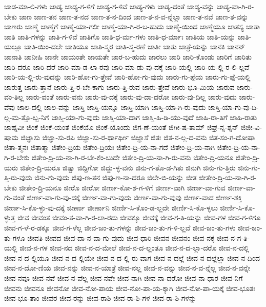 {ಜಾಡ-ಮಾ-ಲಿ-ಗಳು
ಜಾಡ್ಯ
ಜಾಡ್ಯ-ಗ-ಳಿಗೆ
ಜಾಡ್ಯ-ಗ-ಳಿವೆ
ಜಾಡ್ಯ-ಗಳು
ಜಾಡ್ಯ-ದಂತೆ
ಜಾಡ್ಯ-ವನ್ನು
ಜಾಡ್ಯ-ವಾ-ಗಿ-ರ-ಬೇಕು
ಜಾಣ
ಜಾಣ-ತನ
ಜಾಣ-ತ-ನದ
ಜಾಣ-ತ-ನ-ದಿಂದ
ಜಾಣ-ತ-ನ-ವ-ನ್ನೆಲ್ಲಾ
ಜಾಣ-ತ-ನವೆ
ಜಾಣ-ತ-ವನ್ನು
ಜಾಣರು
ಜಾಣ್ಮೆ
ಜಾಣ್ಮೆಗೆ
ಜಾಣ್ಮೆ-ಯಾ-ಗಲೀ
ಜಾಣ್ಮೆ-ಯಾ-ಗಿ-ರ-ಬ-ಹುದು
ಜಾಣ್ಮೆ-ಯಿಂದ
ಜಾಣ್ಮೆಯೂ
ಜಾತಸ್ಯ
ಜಾತಾ
ಜಾತಿ
ಜಾತಿ-ಗಳನ್ನು
ಜಾತಿ-ಗ-ಳಿವೆ
ಜಾತಿಗೊ
ಜಾತಿ-ಧ-ರ್ಮ-ಗಳು
ಜಾತಿ-ಧ-ರ್ಮಾಃ
ಜಾತಿಯ
ಜಾತಿ-ಯನ್ನು
ಜಾತಿ-ಯಲ್ಲೂ
ಜಾತಿ-ಯಿಂ-ದಲೇ
ಜಾತಿಯೂ
ಜಾತಿ-ಸ್ಮರ
ಜಾತಿ-ಸ್ಮ-ರಣೆ
ಜಾತೀ
ಜಾತು
ಜಾತ್ರೆ-ಯನ್ನು
ಜಾನಕಿ
ಜಾನನ್
ಜಾನಾತಿ
ಜಾನೀಹಿ
ಜಾನೇ
ಜಾಯಂತೇ
ಜಾಯತೇ
ಜಾರ-ಬ-ಹುದು
ಜಾರಲು
ಜಾರಿ
ಜಾರಿ-ಕೊಂಡು
ಜಾರಿಗೆ
ಜಾರಿತು
ಜಾರಿ-ದರೂ
ಜಾರಿ-ದರೆ
ಜಾರಿ-ಮಾ-ಡ-ಲಾ-ರವು
ಜಾರಿ-ಮಾ-ಡು-ವು-ದಕ್ಕೆ
ಜಾರಿ-ಯಲ್ಲಿ
ಜಾರಿ-ಯ-ಲ್ಲಿ-ರ-ಲಿ-ಲ್ಲವೆ
ಜಾರಿ-ಯ-ಲ್ಲಿ-ರು-ವುದನ್ನು
ಜಾರಿ-ಹೋ-ಗು-ತ್ತೇವೆ
ಜಾರಿ-ಹೋ-ಗು-ವುದು
ಜಾರು-ಗು-ಪ್ಪೆಯ
ಜಾರು-ಗು-ಪ್ಪೆ-ಯಲ್ಲಿ
ಜಾರುತ್ತ
ಜಾರು-ತ್ತಾನೆ
ಜಾರು-ತ್ತಿ-ರ-ಬೇ-ಕಾಗು
ಜಾರು-ತ್ತಿ-ರುವ
ಜಾರು-ತ್ತೇವೆ
ಜಾರು-ಭೂ-ಮಿಯ
ಜಾರುವ
ಜಾರು-ವಂ-ತಿಲ್ಲ
ಜಾರು-ವಂತೆ
ಜಾರು-ವನು
ಜಾರು-ವು-ದಕ್ಕೆ
ಜಾರು-ವು-ದಾ-ದರೋ
ಜಾರು-ವು-ದಿಲ್ಲ
ಜಾರು-ವುದು
ಜಾರು-ವೆವು
ಜಾಲ-ದಲ್ಲಿ
ಜಾಲ-ವನ್ನು
ಜಾಸ್ತಿ
ಜಾಸ್ತಿ-ಯನ್ನೂ
ಜಾಸ್ತಿ-ಯಾಗಿ
ಜಾಸ್ತಿ-ಯಾ-ಗಿ-ರು-ವುದು
ಜಾಸ್ತಿ-ಯಾ-ಗು-ವು-ದಿ-ಲ್ಲ-ಮ-ತ್ತೊ-ಬ್ಬ-ನಿಗೆ
ಜಾಸ್ತಿ-ಯಾ-ಗು-ವುದು
ಜಾಸ್ತಿ-ಯಾ-ದಾಗ
ಜಾಸ್ತಿ-ಹಿ-ಡಿ-ಯು-ವುದೆ
ಜಾಹಿ-ರಾ-ತಿಗೆ
ಜಾಹಿ-ರಾತು
ಜಾಹ್ನವೀ
ಜಿಂಕೆ
ಜಿಂಕೆ-ಯಂತೆ
ಜಿಂಕೆಯೊ
ಜಿಂಕೆ-ಯೊಂದು
ಜಿಗ-ಣೆ-ಯಂತೆ
ಜಿಗೀ-ಷ-ತಾಮ್
ಜಿಘ್ರ-ನ್ನ-ಶ್ನನ್
ಜಿಜೀ-ವಿ-ಷಾಮ
ಜಿಜ್ಞಾಸು
ಜಿಜ್ಞಾ-ಸು-ರಪಿ
ಜಿಜ್ಞಾ-ಸು-ರ-ರ್ಥಾರ್ಥೀ
ಜಿಜ್ಞಾಸೆ
ಜಿತಃ
ಜಿತ-ನ-ಲ್ಲ-ದ-ವನು
ಜಿತ-ಸಂ-ಗ-ದೋಷಾ
ಜಿತಾ-ತ್ಮನಃ
ಜಿತಾತ್ಮಾ
ಜಿತೇಂ-ದ್ರಿಯ
ಜಿತೇಂ-ದ್ರಿಯಃ
ಜಿತೇಂ-ದ್ರಿ-ಯ-ನಾ-ಗದೆ
ಜಿತೇಂ-ದ್ರಿ-ಯ-ನಾಗಿ
ಜಿತೇಂ-ದ್ರಿ-ಯ-ನಾ-ಗಿ-ರ-ಬೇಕು
ಜಿತೇಂ-ದ್ರಿ-ಯ-ನಾ-ಗಿ-ರ-ಬೇ-ಕೆಂ-ಬುದೇ
ಜಿತೇಂ-ದ್ರಿ-ಯ-ನಾ-ಗಿ-ರು-ವನು
ಜಿತೇಂ-ದ್ರಿ-ಯನೂ
ಜಿತೇಂ-ದ್ರಿ-ಯರು
ಜಿತೇಂ-ದ್ರಿ-ಯರೂ
ಜಿತ್ವಾ
ಜಿದ್ದಿಗೋ
ಜಿದ್ದು-ಳ್ಳ-ವನು
ಜಿನು-ಗ-ತೊ-ಡ-ಗಿತು
ಜಿನುಗಿ
ಜಿನು-ಗು-ತ್ತಿರು
ಜಿನು-ಗು-ತ್ತಿ-ರು-ವುದು
ಜಿನು-ಗು-ವುದು
ಜಿಪು-ಣ-ತನ
ಜಿಪು-ಣ-ನಾ-ದರೂ
ಜಿಲೇ-ಬಿ-ಯನ್ನು
ಜೀತ
ಜೀತೇಂ-ದ್ರಿ-ಯ-ನಾ-ಗಿ-ರ-ಬೇಕು
ಜೀತೇಂ-ದ್ರಿ-ಯನೂ
ಜೀರೊ
ಜೀರೋ
ಜೀರ್ಣ-ಕೋ-ಶ-ಗ-ಳಿಗೆ
ಜೀರ್ಣ-ವಾಗಿ
ಜೀರ್ಣ-ವಾ-ಗುವ
ಜೀರ್ಣ-ವಾ-ಗು-ವಂತೆ
ಜೀರ್ಣ-ವಾ-ಗು-ವು-ದಕ್ಕೆ
ಜೀರ್ಣ-ವಾ-ಗು-ವುದು
ಜೀರ್ಣ-ವಾ-ಗು-ವುವು
ಜೀರ್ಣ-ವಾದ
ಜೀರ್ಣ-ಶಕ್ತಿ
ಜೀರ್ಣ-ಸಿ-ಕೊ-ಳ್ಳು-ವು-ದಕ್ಕೆ
ಜೀರ್ಣಾ
ಜೀರ್ಣಾನಿ
ಜೀರ್ಣಿ-ಸಿ-ಕೊಂ-ಡ-ಲ್ಲದೇ
ಜೀರ್ಣಿ-ಸಿ-ಕೊ-ಳ್ಳಲು
ಜೀರ್ಣಿ-ಸಿ-ಕೊ-ಳ್ಳುತ್ತ
ಜೀವ
ಜೀವಂತ
ಜೀವಂ-ತ-ವಾ-ಗಿ-ರ-ಲಾ-ರದು
ಜೀವಕ್ಕೂ
ಜೀವಕ್ಕೆ
ಜೀವ-ಗ-ತಿ-ಯನ್ನು
ಜೀವ-ಗಳ
ಜೀವ-ಗ-ಳಿಗೂ
ಜೀವ-ಗ-ಳೆ-ರ-ಡಕ್ಕೂ
ಜೀವ-ಗ-ಳೆಲ್ಲ
ಜೀವ-ಜಂ-ತು-ಗಳನ್ನು
ಜೀವ-ಜಂ-ತು-ಗ-ಳಿ-ಲ್ಲವೆ
ಜೀವ-ಜಂ-ತು-ಗಳು
ಜೀವ-ಜಂ-ತು-ಗಳೂ
ಜೀವತಿ
ಜೀವದ
ಜೀವ-ದಾ-ನ-ವಾ-ಗು-ವುದು
ಜೀವ-ಧಾರಿ
ಜೀವನ
ಜೀವನಂ
ಜೀವ-ನಕ್ಕೆ
ಜೀವ-ನ-ಗ-ತಿ-ಯಲ್ಲಿ
ಜೀವ-ನ-ಗಳ
ಜೀವ-ನದ
ಜೀವ-ನ-ದ-ಮೇಲೆ
ಜೀವ-ನ-ದ-ಲ್ಲಂತೂ
ಜೀವ-ನ-ದ-ಲ್ಲಾ-ದರೊ
ಜೀವ-ನ-ದಲ್ಲಿ
ಜೀವ-ನ-ದ-ಲ್ಲಿಯೂ
ಜೀವ-ನ-ದ-ಲ್ಲಿಯೇ
ಜೀವ-ನ-ದ-ಲ್ಲಿ-ರು-ವಾಗ
ಜೀವ-ನ-ದಲ್ಲೆ
ಜೀವ-ನ-ದಲ್ಲೆಲ್ಲಾ
ಜೀವ-ನ-ದಿಂದ
ಜೀವ-ನ-ದೋ-ಣಿಯ
ಜೀವ-ನನ್ನು
ಜೀವ-ನ-ಯಾತ್ರೆ
ಜೀವ-ನಲ್ಲ
ಜೀವ-ನ-ವನ್ನು
ಜೀವ-ನ-ವ-ನ್ನೆಲ್ಲ
ಜೀವ-ನ-ವನ್ನೇ
ಜೀವ-ನವೂ
ಜೀವ-ನವೆ
ಜೀವ-ನ-ವೆಲ್ಲ
ಜೀವ-ನವೇ
ಜೀವ-ನಾಗಿ
ಜೀವ-ನಾ-ದರೋ
ಜೀವ-ನಾ-ಧಾರ
ಜೀವ-ನಿಗೆ
ಜೀವನು
ಜೀವನೂ
ಜೀವನೋ
ಜೀವ-ನೋ-ಪಾಯ
ಜೀವ-ನೋ-ಪಾ-ಯ-ಕ್ಕಾಗಿ
ಜೀವ-ನೋ-ಪಾ-ಯಕ್ಕೆ
ಜೀವ-ಭೂತಃ
ಜೀವ-ಭೂ-ತಾಂ
ಜೀವರ
ಜೀವ-ರನ್ನು
ಜೀವ-ರಾಶಿ
ಜೀವ-ರಾ-ಶಿ-ಗಳ
ಜೀವ-ರಾ-ಶಿ-ಗಳನ್ನು
}
